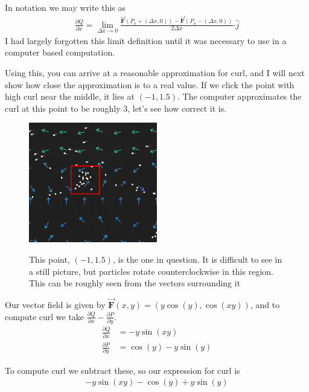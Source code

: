 \documentclass{article}
\begin{document}
    In notation we may write this as
    \begin{gather*}
        \frac{\partial Q}{\partial x} = \lim_{\Delta x \to 0} \frac{\vec{\mathbf{F}}(P_o + (\Delta x, 0)) - \vec{\mathbf{F}} (P_o - (\Delta x, 0))}{2\Delta x} \boldsymbol{\cdot} \hat{j}
    \end{gather*}
    I had largely forgotten this limit definition until it was necessary to use in a computer based computation.

    Using this, you can arrive at a reasonable approximation for curl, and I will next show how close the approximation is to a real value.
    If we click the point with high curl near the middle, it lies at $(-1, 1.5)$.
    The computer approximates the curl at this point to be roughly $3$, let's see how correct it is.
    \begin{figure}[h]
        \centering
        \includegraphics[width=0.5\textwidth]{2020-11-19_12-25}

        This point, $(-1, 1.5)$, is the one in question. It is difficult to see in a still picture, but particles rotate counterclockwise in this region.
        This can be roughly seen from the vectors surrounding it
    \end{figure}

    Our vector field is given by $\vec{ \mathbf{F} } (x, y) = (y \cos(y), \cos(xy))$, and to compute curl we take $\frac{\partial Q}{\partial x} - \frac{\partial P}{\partial y}$. 
    \begin{align*}
        \frac{\partial Q}{\partial x} &= -y\sin(xy) \\ 
        \frac{\partial P}{\partial y} &= \cos(y) - y\sin(y)
    \end{align*}

    To compute curl we subtract these, so our expression for curl is 
    \begin{gather*}
        -y\sin(xy) - \cos(y) + y\sin(y)
    \end{gather*}
\end{document}

